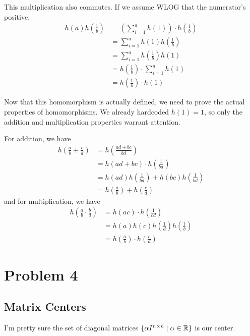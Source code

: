 \documentclass[12pt]{article}
\begin{document}
This multiplication also commutes.
If we assume WLOG that the numerator's positive,
\begin{align*}
  h(a)h\left(\frac{1}{b}\right)
   & = \left(\sum_{i=1}^{a} h(1)\right) \cdot h\left(\frac{1}{b}\right) \\
   & = \sum_{i=1}^{a} h(1)h\left(\frac{1}{b}\right)                     \\
   & = \sum_{i=1}^{a} h\left(\frac{1}{b}\right)h(1)                     \\
   & = h\left(\frac{1}{b}\right) \cdot \sum_{i=1}^{a} h(1)              \\
   & = h\left(\frac{1}{b}\right) \cdot h(1)
\end{align*}

Now that this homomorphism is actually defined, we need to prove the actual properties of homomorphisms.
We already hardcoded $h(1)=1$, so only the addition and multiplication properties warrant attention.

For addition, we have
\begin{align*}
  h\left(\frac{a}{b}+\frac{c}{d}\right)
   & = h\left(\frac{ad+bc}{bd}\right)                                    \\
   & = h(ad+bc) \cdot h\left(\frac{1}{bd}\right)                         \\
   & = h(ad)h\left(\frac{1}{bd}\right) + h(bc)h\left(\frac{1}{bd}\right) \\
   & = h\left(\frac{a}{b}\right) + h\left(\frac{c}{d}\right)
\end{align*}
and for multiplication, we have
\begin{align*}
  h\left(\frac{a}{b} \cdot \frac{b}{d}\right)
   & = h(ac) \cdot h\left(\frac{1}{cd}\right)                     \\
   & = h(a)h(c)h\left(\frac{1}{d}\right)h\left(\frac{1}{b}\right) \\
   & = h\left(\frac{a}{b}\right) \cdot h\left(\frac{c}{d}\right)
\end{align*}

\section{Problem 4}

\subsection{Matrix Centers}

I'm pretty sure the set of diagonal matrices
$\left\{\alpha I^{n \times n} \mid \alpha \in \mathbb{R}\right\}$ is our center.
\end{document}
